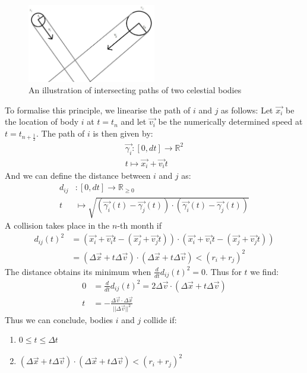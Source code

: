 \begin{figure}[H]
  \centering
  \includegraphics[width=0.5\textwidth]{botsingnaderbekeken}
  \caption{An illustration of intersecting paths of two celestial bodies}
  \label{fig:bots}
\end{figure}
 To formalise this principle, we linearise the path of \(i\) and \(j\) as follows: 
 Let \(\vec{x_i}\) be the location of body \(i\) at \(t=t_n\) and let \(\vec{v_i}\) be the numerically determined speed at \(t=t_{n+\frac{1}{2}}\).
The path of \(i\) is then given by:
\begin{align*}
\vec{\gamma_i}:[0,dt]\rightarrow\mathbb{R}^2 \\
t\mapsto \vec{x_i}+\vec{v_i}t
\end{align*}
And we can define the distance between \(i\) and \(j\) as:
\begin{align*}
	d_{ij}&:[0,dt]\rightarrow \mathbb{R}_{\geq 0}\\
	t&\mapsto \sqrt{(\vec{\gamma_i}(t)-\vec{\gamma_j}(t))\cdot(\vec{\gamma_i}(t)-\vec{\gamma_j}(t))}
\end{align*}
 A collision takes place in the \(n\)-th month if 
 \begin{align*}
	d_{ij}(t)^2&=(\vec{x_i}+\vec{v_i}t-(\vec{x_j}+\vec{v_j}t))\cdot (\vec{x_i}+\vec{v_i}t-(\vec{x_j}+\vec{v_j}t))\\
	&= (\Delta\vec{x} +t\Delta\vec{v})\cdot(\Delta\vec{x} +t\Delta\vec{v})<(r_i+r_j)^2
 \end{align*}
  The distance obtains its minimum when \(\frac{d}{dt}d_{ij}(t)^2=0\). Thus for \(t\) we find:
  \begin{align*}
  0&=\frac{d}{dt}d_{ij}(t)^2 =2\Delta\vec{v}\cdot(\Delta\vec{x}+t\Delta\vec{v})\\
  t&=-\frac{\Delta\vec{v}\cdot \Delta\vec{x}}{||\Delta \vec{v}||^2}
  \end{align*}
  Thus we can conclude, bodies \(i\) and \(j\) collide if:
 \begin{enumerate}
  \item \(0\leq t \leq \Delta t\) 
  \item \((\Delta\vec{x} +t\Delta\vec{v})\cdot(\Delta\vec{x} +t\Delta\vec{v}) <(r_i+r_j)^2\)
\end{enumerate} 
